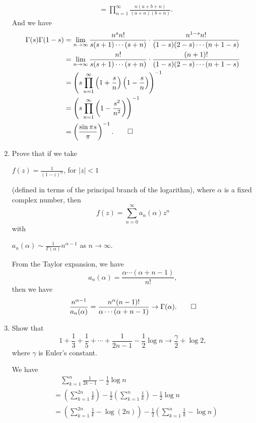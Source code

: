 \documentclass[11pt]{report}
\theoremstyle{mythm}
\let\oldendproof\endproof
\renewenvironment{proof}[1][\proofname]{%
  \oldproof[\normalfont \bfseries #1]%
}{\oldendproof}
\renewcommand*{\proofname}{Proof}
\theoremstyle{myans}
\begin{document}
\begin{enumerate}
\begin{proof}
\begin{align*}
      &= \prod_{n=1}^\infty \frac{n (a+b+n)}{(a+n)(b+n)}.
    \end{align*}
    And we have
    \begin{align*}
      \Gamma(s)\Gamma(1-s) &= \lim_{n\to \infty} \frac{n^sn!}{s(s+1)\cdots(s+n)}
      \cdot \frac{n^{1-s}n!}{(1-s)(2-s)\cdots(n+1-s)}\\
      &= \lim_{n\to \infty} \frac{n!}{s(s+1)\cdots(s+n)}
      \cdot \frac{(n+1)!}{(1-s)(2-s)\cdots(n+1-s)}\\
      &= \left(s \prod_{n=1}^\infty \left(1 + \frac s n\right) \left(1 - \frac{s}{n}\right) \right)^{-1}\\
      &= \left(s \prod_{n=1}^\infty \left(1 - \frac{s^2}{n^2}\right) \right)^{-1}\\
      &= \left(\frac{\sin \pi s} \pi\right)^{-1}. \qedhere
    \end{align*}
  \end{proof}
  \setcounter{enumi}{3}
  \item Prove that if we take
  \begin{center}
    $\displaystyle f(z) = \frac 1{(1-z)^\alpha}$, \quad for $|z|<1$
  \end{center}
  (defined in terms of the principal branch of the logarithm), where $\alpha$ is a fixed
  complex number, then
  \[ f(z) = \sum_{n=0}^\infty a_n(\alpha) z^n \]
  with
  \begin{center}
    $\displaystyle a_n(\alpha) \sim \frac 1{\Gamma(\alpha)} n^{\alpha-1}$ \quad as $n\to\infty$.
  \end{center}
  \begin{proof}
    From the Taylor expansion, we have
    \[ a_n(\alpha) = \frac{\alpha \cdots (\alpha + n - 1)}{n!}, \]
    then we have
    \[ \frac{n^{\alpha - 1}}{a_n(\alpha)} = \frac{n^{\alpha}(n-1)!}{\alpha\cdots(\alpha+n-1)} \to \Gamma(\alpha). \qedhere \]
  \end{proof}
  \setcounter{enumi}{5}
  \item Show that
  \[ 1 + \frac 13 + \frac 15 + \cdots + \frac 1{2n-1} - \frac 12 \log n \to \frac{\gamma}{2} + \log 2, \]
  where $\gamma$ is Euler's constant.
  \begin{proof}
    We have
    \begin{align*}
      &\quad \sum_{k=1}^n \frac 1{2k-1} - \frac 12 \log n\\
      &= \left(\sum_{k=1}^{2n} \frac 1{k}\right) - \frac 12 \left(\sum_{k=1}^n\frac 1{k}\right) - \frac 12 \log n\\
      &= \left(\sum_{k=1}^{2n} \frac 1{k} - \log (2n)\right) - \frac 12 \left(\sum_{k=1}^n\frac 1{k} - \log n\right)

\end{align*}
\end{proof}
\end{enumerate}
\end{document}
